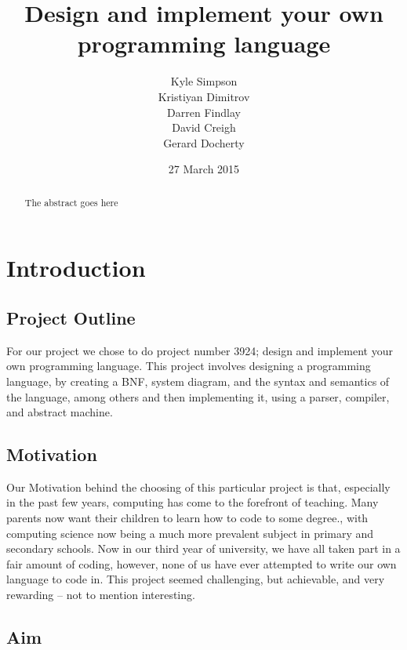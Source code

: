 \documentclass{l3proj}
\begin{document}
\title{Design and implement your own programming language}
\author{Kyle Simpson\\
		Kristiyan Dimitrov\\
		Darren Findlay\\
		David Creigh\\
		Gerard Docherty}
\date{27 March 2015}
\maketitle
\begin{abstract}

The abstract goes here

\end{abstract}
\educationalconsent
\tableofcontents
\chapter{Introduction}
\label{intro}

\section{Project Outline}

For our project we chose to do project number 3924; design and implement your own programming language. This project involves designing a programming language, by creating a BNF, system diagram, and the syntax and semantics of the language, among others and then implementing it, using a parser, compiler, and abstract machine.

\section{Motivation}

Our Motivation behind the choosing of this particular project is that, especially in the past few years, computing has come to the forefront of teaching. Many parents now want their children to learn how to code to some degree., with computing science now being a much more prevalent subject in primary and secondary schools. Now in our third year of university, we have all taken part in a fair amount of coding, however, none of us have ever attempted to write our own language to code in. This project seemed challenging, but achievable, and very rewarding – not to mention interesting.

\section{Aim}
\end{document}
